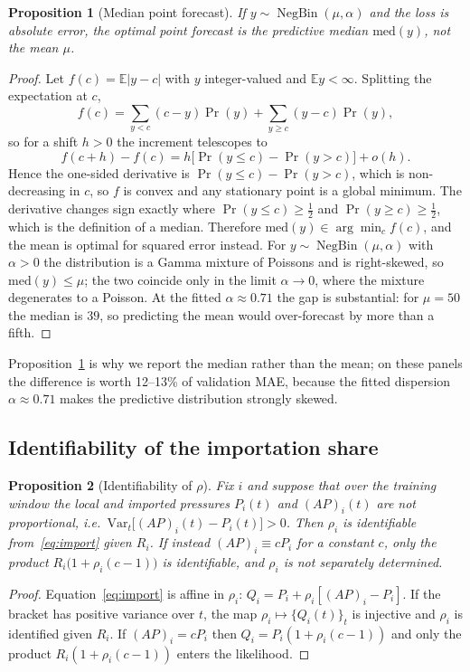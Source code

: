 \documentclass[conference]{IEEEtran}
\newtheorem{proposition}{Proposition}
\DeclareMathOperator{\NB}{NegBin}
\newcommand{\E}{\mathbb{E}}
\begin{document}
\begin{proposition}[Median point forecast]\label{prop:median}
If $y\sim\NB(\mu,\alpha)$ and the loss is absolute error, the optimal point forecast is the predictive median $\mathrm{med}(y)$, not the mean $\mu$.
\end{proposition}
\begin{proof}
Let $f(c)=\E|y-c|$ with $y$ integer-valued and $\E y<\infty$. Splitting the expectation at $c$,
\begin{equation}
f(c)=\sum_{y<c}(c-y)\Pr(y)+\sum_{y\ge c}(y-c)\Pr(y),
\end{equation}
so for a shift $h>0$ the increment telescopes to
\begin{equation}
f(c+h)-f(c)=h\big[\Pr(y\le c)-\Pr(y>c)\big]+o(h).
\end{equation}
Hence the one-sided derivative is $\Pr(y\le c)-\Pr(y>c)$, which is non-decreasing in $c$, so $f$ is convex and any stationary point is a global minimum. The derivative changes sign exactly where $\Pr(y\le c)\ge\tfrac12$ and $\Pr(y\ge c)\ge\tfrac12$, which is the definition of a median. Therefore $\mathrm{med}(y)\in\arg\min_c f(c)$, and the mean is optimal for squared error instead. For $y\sim\NB(\mu,\alpha)$ with $\alpha>0$ the distribution is a Gamma mixture of Poissons and is right-skewed, so $\mathrm{med}(y)\le\mu$; the two coincide only in the limit $\alpha\to0$, where the mixture degenerates to a Poisson. At the fitted $\alpha\approx0.71$ the gap is substantial: for $\mu=50$ the median is $39$, so predicting the mean would over-forecast by more than a fifth.
\end{proof}

Proposition~\ref{prop:median} is why we report the median rather than the mean; on these panels the difference is worth 12--13\% of validation MAE, because the fitted dispersion $\alpha\approx0.71$ makes the predictive distribution strongly skewed.

\subsection{Identifiability of the importation share}

\begin{proposition}[Identifiability of $\rho$]\label{prop:ident}
Fix $i$ and suppose that over the training window the local and imported pressures $P_i(t)$ and $(AP)_i(t)$ are not proportional, i.e.\ $\mathrm{Var}_t\big[(AP)_i(t)-P_i(t)\big]>0$. Then $\rho_i$ is identifiable from~\eqref{eq:import} given $R_i$. If instead $(AP)_i \equiv cP_i$ for a constant $c$, only the product $R_i\big(1+\rho_i(c-1)\big)$ is identifiable, and $\rho_i$ is not separately determined.
\end{proposition}
\begin{proof}
Equation~\eqref{eq:import} is affine in $\rho_i$: $Q_i=P_i+\rho_i[(AP)_i-P_i]$. If the bracket has positive variance over $t$, the map $\rho_i\mapsto\{Q_i(t)\}_t$ is injective and $\rho_i$ is identified given $R_i$. If $(AP)_i=cP_i$ then $Q_i=P_i(1+\rho_i(c-1))$ and only the product $R_i(1+\rho_i(c-1))$ enters the likelihood. \end{proof}
\end{document}
